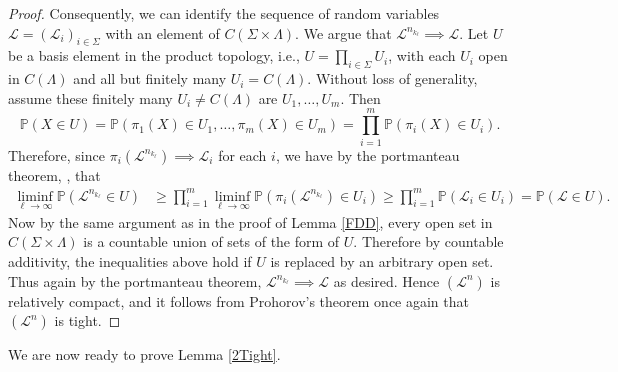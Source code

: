 \begin{proof}
Consequently, we can identify the sequence of random variables $\mathcal{L} = (\mathcal{L}_i)_{i\in\Sigma}$ with an element of $C(\Sigma\times\Lambda)$. We argue that $\mathcal{L}^{n_{k_\ell}}\implies \mathcal{L}$. Let $U$ be a basis element in the product topology, i.e., $U = \prod_{i\in\Sigma} U_i$, with each $U_i$ open in $C(\Lambda)$ and all but finitely many $U_i = C(\Lambda)$. Without loss of generality, assume these finitely many $U_i\neq C(\Lambda)$ are $U_1,\dots,U_m$. Then
\[
\mathbb{P}(X \in U) = \mathbb{P}(\pi_1(X) \in U_1, \dots, \pi_m(X) \in U_m) = \prod_{i=1}^m \mathbb{P}(\pi_i(X)\in U_i).
\]
Therefore, since $\pi_i(\mathcal{L}^{n_{k_\ell}}) \implies \mathcal{L}_i$ for each $i$, we have by the portmanteau theorem, \cite[Theorem 2.1]{Billing}, that
\begin{align*}
\liminf_{\ell\to\infty} \mathbb{P}(\mathcal{L}^{n_{k_\ell}} \in U) &\geq \prod_{i=1}^m \liminf_{\ell\to\infty} \mathbb{P}(\pi_i(\mathcal{L}^{n_{k_\ell}})\in U_i) \geq \prod_{i=1}^m \mathbb{P}(\mathcal{L}_i \in U_i) = \mathbb{P}(\mathcal{L}\in U).
\end{align*}
Now by the same argument as in the proof of Lemma \ref{FDD}, every open set in $C(\Sigma\times\Lambda)$ is a countable union of sets of the form of $U$. Therefore by countable additivity, the inequalities above hold if $U$ is replaced by an arbitrary open set. Thus again by the portmanteau theorem, $\mathcal{L}^{n_{k_\ell}} \implies \mathcal{L}$ as desired. Hence $(\mathcal{L}^n)$ is relatively compact, and it follows from Prohorov's theorem  once again that $(\mathcal{L}^n)$ is tight.

\end{proof}

We are now ready to prove Lemma \ref{2Tight}.

